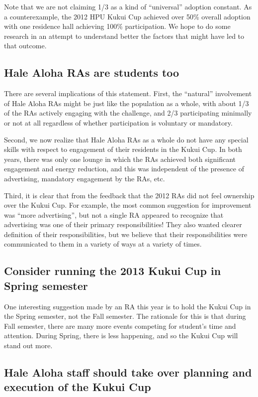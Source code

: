 \documentclass[]{article}
\begin{document}
Note that we are not claiming 1/3 as a kind of ``universal'' adoption constant.  As a
counterexample, the 2012 HPU Kukui Cup achieved over 50\% overall adoption with one
residence hall achieving 100\% participation.  We hope to do some research in an attempt
to understand better the factors that might have led to that outcome.

\subsection{Hale Aloha RAs are students too}  

There are several implications of this statement.  First, the ``natural'' involvement of
Hale Aloha RAs might be just like the population as a whole, with about 1/3 of the RAs
actively engaging with the challenge, and 2/3 participating minimally or not at all
regardless of whether participation is voluntary or mandatory.

Second, we now realize that Hale Aloha RAs as a whole do not have any special skills with
respect to engagement of their residents in the Kukui Cup.  In both years, there was only
one lounge in which the RAs achieved both significant engagement and energy reduction, and
this was independent of the presence of advertising, mandatory engagement by the RAs, etc.

Third, it is clear that from the feedback that the 2012 RAs did not feel ownership over
the Kukui Cup.  For example, the most common suggestion for improvement was ``more
advertising'', but not a single RA appeared to recognize that advertising was one of their
primary responsibilities!  They also wanted clearer definition of their responsibilities,
but we believe that their responsibilities were communicated to them in a variety of ways
at a variety of times.

\subsection{Consider running the 2013 Kukui Cup in Spring semester}  

One interesting suggestion made by an RA this year is to hold the Kukui Cup in the Spring
semester, not the Fall semester.  The rationale for this is that during Fall semester,
there are many more events competing for student's time and attention.  During Spring,
there is less happening, and so the Kukui Cup will stand out more.


\subsection{Hale Aloha staff should take over planning and execution of the Kukui Cup}  
\end{document}
